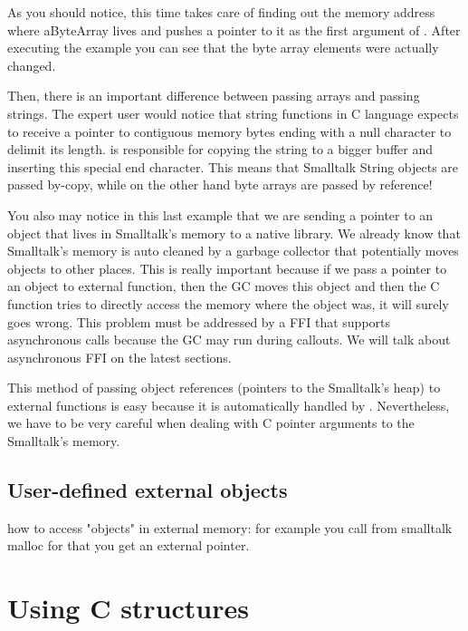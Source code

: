 \documentclass[a4paper,10pt,twoside]{book}
\begin{document}
As you should notice, this time \NativeBoost takes care of finding out the memory address where aByteArray lives and pushes a pointer to it as the first argument of . After executing the example you can see that the byte array elements were actually changed. 

Then, there is an important difference between passing arrays and passing strings. The expert user would notice that string functions in C language expects to receive a pointer to contiguous memory bytes ending with a null character to delimit its length.  \NativeBoost is responsible for copying the string to a bigger buffer and inserting this special end character. This means that Smalltalk String objects are passed by-copy, while on the other hand byte arrays are passed by reference!

You also may notice in this last example that we are sending a pointer to an object that lives in Smalltalk's memory to a native library. 
We already know that Smalltalk's memory is auto cleaned by a garbage collector that potentially moves objects to other places.
This is really important because if we pass a pointer to an object to external function, then the GC moves this object and then the C function tries to directly access the memory where the object was, it will surely goes wrong.
This problem must be addressed by a FFI that supports asynchronous calls because the GC may run during callouts.
We will talk about asynchronous FFI on the latest sections.

This method of passing object references (pointers to the Smalltalk's heap) to external functions is easy because it is automatically handled by \NativeBoost.
Nevertheless, we have to be very careful when dealing with C pointer arguments to the Smalltalk's memory. 


\subsection{User-defined external objects} %

how to access "objects" in external memory: for example you call from smalltalk malloc for that you get an external pointer.


\section{Using C structures}
\end{document}
